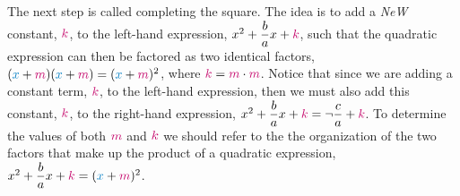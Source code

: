 The next step is called completing the square.  The idea is to add a \textit{NeW} constant, $\color{stockholmPink}k$, to the left-hand expression, $x^2 +\dfrac{b}{a}x+\color{stockholmPink}k$,  such that the quadratic expression can then be factored as two identical factors, $({\color{stockholmBlue}x}+{\color{stockholmPink}m})({\color{stockholmBlue}x}+{\color{stockholmPink}m}) = ({\color{stockholmBlue}x}+{\color{stockholmPink}m})^2$, where  ${{\color{stockholmPink}k}=\color{stockholmPink}m} \cdot {\color{stockholmPink}m}$.  Notice that since we are adding a constant term, $\color{stockholmPink}k$, to the left-hand expression, then we must also add this constant, ${\color{stockholmPink}k}$, to the right-hand expression, $x^2 +\dfrac{b}{a}x+{\color{stockholmPink}k} = \neg \dfrac{c}{a}+{\color{stockholmPink}k}$.  To determine the values of both ${\color{stockholmPink}m}$ and ${\color{stockholmPink}k}$ we should refer to the the organization of the two factors that make up the product of a quadratic expression, $x^2 +\dfrac{b}{a}x+{\color{stockholmPink}k}= ({\color{stockholmBlue}x}+{\color{stockholmPink}m})^2$.\\



